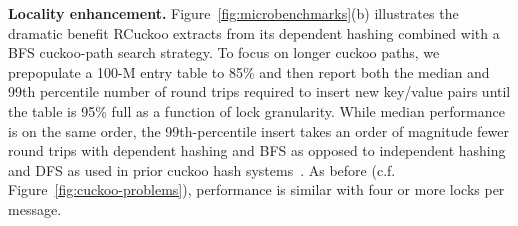 
\textbf{Locality enhancement.}
Figure~\ref{fig:microbenchmarks}(b) illustrates the dramatic benefit
RCuckoo extracts from its dependent hashing combined with a BFS
cuckoo-path search strategy.  To focus on longer cuckoo paths, we
prepopulate a 100-M entry table to 85\% and then report both the median
and 99th percentile number of round trips required to insert new
key/value pairs until the table is 95\% full as a function of lock
granularity.  While median performance is on the same order, the
99th-percentile insert takes an order of magnitude fewer round trips
with dependent hashing and BFS as opposed to independent hashing and
DFS as used in prior cuckoo hash
systems~\cite{cuckoo-improvements,pilaf,cuckoo}.  As before
(c.f. Figure~\ref{fig:cuckoo-problems}), performance is similar with
four or more locks per message.





